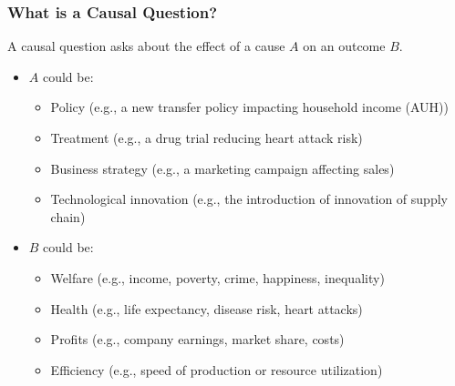 \documentclass[xcolor=svgnames,t]{beamer}
\begin{document}
\begin{frame}
    \frametitle{What is a Causal Question?}
    
    \begin{center}
    \end{center}
    
    \pause %
    
    A causal question asks about the effect of a cause \(A\) on an outcome \(B\).
    
    \pause %
    \begin{itemize}
        \item \(A\) could be: %
        \begin{itemize}
            \pause
            \item Policy (e.g., a new transfer policy impacting household income (AUH))
            \pause
            \item Treatment (e.g., a drug trial reducing heart attack risk)
            \pause
            \item Business strategy (e.g., a marketing campaign affecting sales)
            \pause
            \item Technological innovation (e.g., the introduction of innovation of supply chain)
        \end{itemize}
        
        \pause %
        \item \(B\) could be: %
        \begin{itemize}
            \pause
            \item Welfare (e.g., income, poverty, crime, happiness, inequality)
            \pause
            \item Health (e.g., life expectancy, disease risk, heart attacks)
            \pause
            \item Profits (e.g., company earnings,  market share, costs)
            \pause
            \item Efficiency (e.g., speed of production or resource utilization)
        \end{itemize}
    \end{itemize}
\end{frame}
\end{document}
